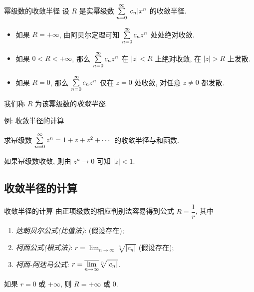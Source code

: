 \begin{frame}{幂级数的收敛半径}
	\onslide<+->
	设 $R$ 是实幂级数 $\sum\limits_{n=0}^\infty|c_n|x^n$ 的收敛半径.
	\begin{itemize}
		\item 如果 $R=+\infty$, 由阿贝尔定理可知 $\sum\limits_{n=0}^\infty c_nz^n$ 处处绝对收敛.
		\item 如果 $0<R<+\infty$, 那么 $\sum\limits_{n=0}^\infty c_nz^n$ 在 $|z|<R$ 上绝对收敛, 在 $|z|>R$ 上发散.
		\item 如果 $R=0$, 那么 $\sum\limits_{n=0}^\infty c_nz^n$ 仅在 $z=0$ 处收敛, 对任意 $z\neq 0$ 都发散.
	\end{itemize}
	\onslide<+->
	我们称 $R$ 为该幂级数的\emph{收敛半径}.

	\onslide<+->
	\begin{center}
	\end{center}
\end{frame}


\begin{frame}{例: 收敛半径的计算}
	\onslide<+->
	\begin{example}
		求幂级数 $\sum\limits_{n=0}^\infty z^n=1+z+z^2+\cdots$ 的收敛半径与和函数.
	\end{example}

	\onslide<+->
	\begin{solution}
		如果幂级数收敛, 则由 $z^n\to0$ 可知 $|z|<1$.
		\onslide<+->{因此收敛半径为 $1$.}
	\end{solution}
\end{frame}


\subsection{收敛半径的计算}
\begin{frame}{收敛半径的计算}
	\onslide<+->
	由正项级数的相应判别法容易得到公式 $R=\dfrac1r$, 其中
	\begin{enumerate}
		\item \emph{达朗贝尔公式(比值法)}:  (假设存在);
		\item \emph{柯西公式(根式法)}: $r=\displaystyle\lim_{n\to\infty}\sqrt[n]{|c_n|}$ (假设存在);
		\item \emph{柯西-阿达马公式}: $r=\displaystyle\overline{\lim_{n\to\infty}} \sqrt[n]{|c_n|}$.
	\end{enumerate}
	\onslide<+->
	如果 $r=0$ 或 $+\infty$, 则 $R=+\infty$ 或 $0$.
\end{frame}


